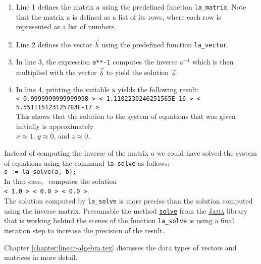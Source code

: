 \begin{enumerate}
\item Line 1 defines the matrix $\mathrm{a}$ using the predefined function \texttt{la\_matrix}.
      Note that the matrix $\mathrm{a}$ is defined as a list of its rows, where each row is
      represented as a list of numbers.
\item Line 2 defines the vector $\vec{b}$ using the predefined function \texttt{la\_vector}.
\item In line 3, the expression \texttt{a**-1} computes the inverse $\mathrm{a}^{-1}$ which is then
      multiplied with the vector $\vec{b}$ to yield the solution $\vec{s}$.
\item In line 4, printing the variable \texttt{s} yields the following result:
      \\[0.2cm]
      \hspace*{-0.8cm}
      \texttt{< 0.9999999999999998 >  < 1.1102230246251565E-16 >  < 5.551115123125783E-17 >}
      \\[0.2cm]
      This shows that the solution to the system of equations that was given initially is approximately
      \\[0.2cm]
      \hspace*{1.3cm}
      $x \approx 1$, \quad $y \approx 0$, \quad and \quad $z \approx 0$.  
\end{enumerate}
Instead of computing the inverse of the matrix $a$ we could have solved the system of equations
using the command \texttt{la\_solve} as follows:
\\[0.2cm]
\hspace*{1.3cm}
\texttt{s := la\_solve(a, b);}
\\[0.2cm]
In that case, \setlx\ computes the solution
\\[0.2cm]
\hspace*{1.3cm}
\texttt{< 1.0 >  < 0.0 >  < 0.0 >}.
\\[0.2cm]
The solution computed by \texttt{la\_solve} is more precise than the solution computed using the
inverse matrix.  Presumable the method
\href{http://math.nist.gov/javanumerics/jama/doc/Jama/Matrix.html#solve(Jama.Matrix)}{\texttt{solve}}
from the \href{http://math.nist.gov/javanumerics/jama}{\textsc{Jama}} library that is working behind the
scenes of the function \texttt{la\_solve} is using a final iteration step to increase the precision
of the result.
\vspace*{0.2cm}

\noindent
Chapter \ref{chapter:linear-algebra.tex} discusses the data types of vectors and matrices in more
detail. 




